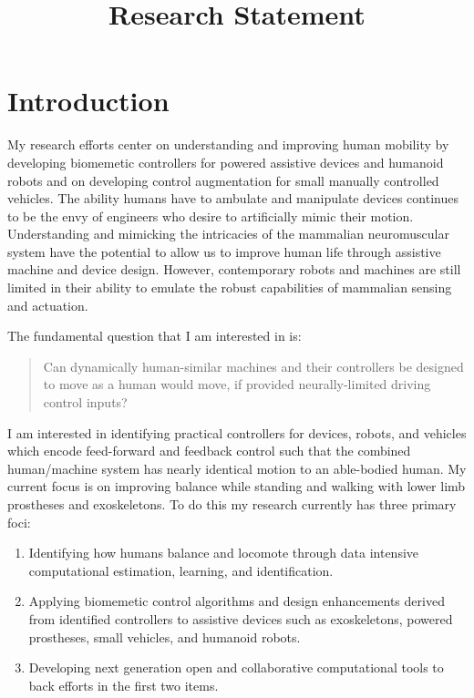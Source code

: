 \documentclass[letter]{article}
\title{\phantomsection%
  Research Statement%
  \label{research-statement}}
\author{}
\date{}
\begin{document}
\maketitle


\section{Introduction%
  \label{introduction}%
}

My research efforts center on understanding and improving human mobility by
developing biomemetic controllers for powered assistive devices and humanoid
robots and on developing control augmentation for small manually controlled
vehicles. The ability humans have to ambulate and manipulate devices continues
to be the envy of engineers who desire to artificially mimic their motion.
Understanding and mimicking the intricacies of the mammalian neuromuscular
system have the potential to allow us to improve human life through assistive
machine and device design. However, contemporary robots and machines are still
limited in their ability to emulate the robust capabilities of mammalian
sensing and actuation.

The fundamental question that I am interested in is:

\begin{quote}
Can dynamically human-similar machines and their controllers be designed to
move as a human would move, if provided neurally-limited driving control
inputs?
\end{quote}

I am interested in identifying practical controllers for devices, robots, and
vehicles which encode feed-forward and feedback control such that the combined
human/machine system has nearly identical motion to an able-bodied human. My
current focus is on improving balance while standing and walking with lower
limb prostheses and exoskeletons. To do this my research currently has three
primary foci:

\begin{enumerate}
\item Identifying how humans balance and locomote through data intensive
computational estimation, learning, and identification.

\item Applying biomemetic control algorithms and design enhancements derived from
identified controllers to assistive devices such as exoskeletons, powered
prostheses, small vehicles, and humanoid robots.

\item Developing next generation open and collaborative computational tools to
back efforts in the first two items.
\end{enumerate}
\end{document}
